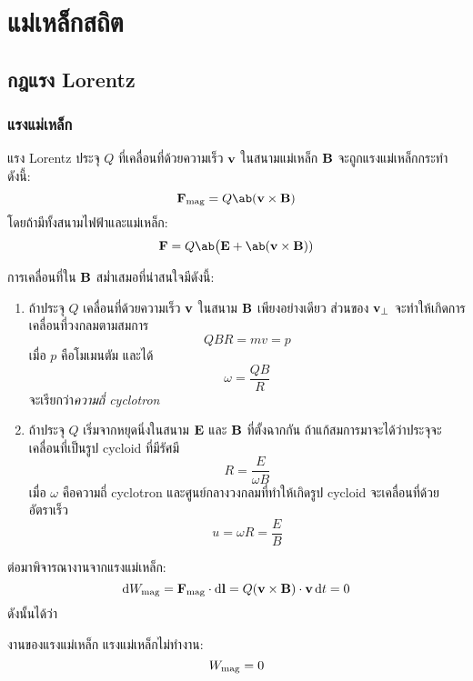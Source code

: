 \chapter{แม่เหล็กสถิต}
\section{กฎแรง Lorentz}
\subsection{แรงแม่เหล็ก}

\begin{lawbox}{แรง Lorentz}
    ประจุ $Q$ ที่เคลื่อนที่ด้วยความเร็ว $\mathbf{v}$ ในสนามแม่เหล็ก $\mathbf{B}$ จะถูกแรงแม่เหล็กกระทำดังนี้:
    \begin{equation}
        \vb{F}_\txt{mag} = Q\ab(\vb{v}\times\vb{B})
    \end{equation}
    โดยถ้ามีทั้งสนามไฟฟ้าและแม่เหล็ก:
    \begin{equation}
        \vb{F} = Q\ab\big(\vb{E} + \ab(\vb{v}\times\vb{B}))\label{lorentz}
    \end{equation}
\end{lawbox}
การเคลื่อนที่ใน $\mathbf{B}$ สม่ำเสมอที่น่าสนใจมีดังนี้:
\begin{enumerate}
    \item ถ้าประจุ $Q$ เคลื่อนที่ด้วยความเร็ว $\mathbf{v}$ ในสนาม $\mathbf{B}$ เพียงอย่างเดียว ส่วนของ $\mathbf{v}_\perp$ จะทำให้เกิดการเคลื่อนที่วงกลมตามสมการ
    \[
    QBR=mv=p
    \]
    เมื่อ $p$ คือโมเมนตัม และได้
    \[
    \omega = \frac{QB}{R}
    \]
    จะเรียกว่า\emph{ความถี่ cyclotron}
    \item ถ้าประจุ $Q$ เริ่มจากหยุดนิ่งในสนาม $\mathbf{E}$ และ $\mathbf{B}$ ที่ตั้งฉากกัน ถ้าแก้สมการมาจะได้ว่าประจุจะเคลื่อนที่เป็นรูป cycloid ที่มีรัศมี
    \[
    R=\frac{E}{\omega B}
    \]
    เมื่อ $\omega$ คือความถี่ cyclotron และศูนย์กลางวงกลมที่ทำให้เกิดรูป cycloid จะเคลื่อนที่ด้วยอัตราเร็ว
    \[
    u=\omega R=\frac{E}{B}
    \]
\end{enumerate}
ต่อมาพิจารณางานจากแรงแม่เหล็ก:
\[
\odif{W}_\txt{mag}=\vb{F}_\txt{mag}\cdot\odif{\vb{l}}=Q(\vb{v}\times\vb{B})\cdot\vb{v}\odif{t}=0
\]
ดังนั้นได้ว่า
\begin{corbox}{งานของแรงแม่เหล็ก}
    แรงแม่เหล็กไม่ทำงาน:
    \begin{equation}
        W_{\mathrm{mag}}=0
    \end{equation}
\end{corbox}

